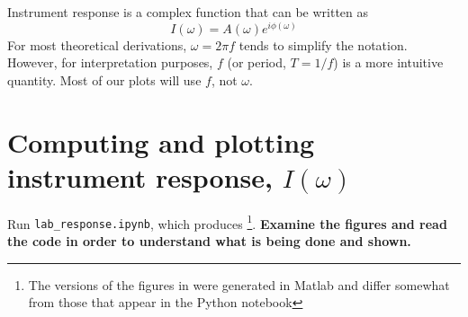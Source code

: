 \documentclass[11pt,titlepage,fleqn]{article}
\newcommand{\tfile}{{\tt lab\_response.ipynb}}
\begin{document}
Instrument response is a complex function that can be written as
%
\begin{equation}
I(\omega) = A(\omega) e^{i \phi(\omega)}
\label{Iw}
\end{equation}
%
For most theoretical derivations, $\omega = 2\pi f$ tends to simplify the notation. However, for interpretation purposes, $f$ (or period, $T = 1/f$) is a more intuitive quantity. Most of our plots will use $f$, not $\omega$.


\pagebreak
\section{Computing and plotting instrument response, $I(\omega)$}

Run \tfile, which produces \footnote{The versions of the figures in  were generated in Matlab and differ somewhat from those that appear in the Python notebook}. {\bf Examine the figures and read the code in order to understand what is being done and shown.}
%
\end{document}
